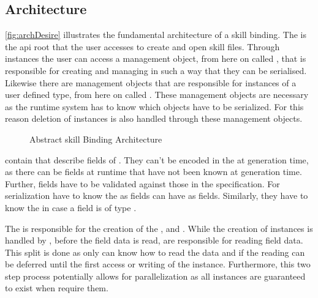 \documentclass[thesis]{subfiles}
\begin{document}
  \subsection{Architecture}\label{sec:skillArch}
    \autoref{fig:archDesire} illustrates the fundamental architecture of a \gls{skill} binding.
    The \SkillFile is the \gls{api} root that the user accesses to create and open \gls{skill} files.
    Through \SkillFile instances the user can access a management object, from here on called \StringPool, that is responsible for creating and managing \Strings in such a way that they can be serialised.
    Likewise there are management objects that are responsible for instances of a user defined type, from here on called \UserTypePools.
    These management objects are necessary as the runtime system has to know which objects have to be serialized.
    For this reason deletion of instances is also handled through these management objects.%
    ~\autocite[107--112]{skill-dis}

    \begin{figure}[ht]
      \centering
      
      \caption{Abstract \gls{skill} Binding Architecture}\label{fig:archDesire}
    \end{figure}

    \UserTypePools contain \FieldDeclarations that describe fields of \UserTypes.
    They can't be encoded in the \UserTypePools at generation time, as there can be fields at runtime that have not been known at generation time.
    Further, fields have to be validated against those in the specification.
    For serialization \FieldDeclarations have to know the \UserTypePools as \UserType fields can have \UserTypes as fields.
    Similarly, they have to know the \StringPool in case a field is of type \String.%
    ~\autocite[144--148]{skill-dis}

    The \FileReader is responsible for the creation of the \StringPool, \UserTypePools and \FieldDeclarations.
    While the creation of \UserType instances is handled by \UserTypePools, before the field data is read, \FieldDeclarations are responsible for reading field data.
    This split is done as only \FieldDeclarations can know how to read the data and if the reading can be deferred until the first access or writing of the instance.
    Furthermore, this two step process potentially allows for parallelization as all \UserType instances are guaranteed to exist when \FieldDeclarations require them.%
    ~\autocite[148f.]{skill-dis}
\end{document}
